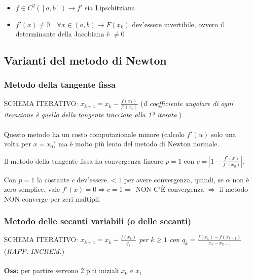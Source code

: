 \documentclass[a4paper, 11pt]{article}
\begin{document}
        \begin{itemize}
            \item $f \in C^2([a, b]) \longrightarrow f'$ sia Lipschitziana
            \item $f'(x) \neq 0 \quad \forall x \in (a, b) \longrightarrow F(x_k)$ dev'essere invertibile, ovvero il determinante della Jacobiana è $\neq 0$
        \end{itemize}


        \subsection{Varianti del metodo di Newton}

        \subsubsection{Metodo della tangente fissa}

        SCHEMA ITERATIVO: $x_{k+1} = x_k - \frac{f(x_k)}{f'(x_0)}$ \quad (\textit{il coefficiente angolare di ogni iterazione è quello della tangente tracciata alla 1ª iterata.})

        \paragraph{}
        Questo metodo ha un costo computazionale minore (calcolo $f'(\alpha)$ solo una volta per $x=x_0$) ma è molto più lento del metodo di Newton normale.

        Il metodo della tangente fissa ha convergenza lineare $p=1$ con $c = \left| 1 - \frac{f'(x)}{f'(x_0)} \right|$.

        Con $p=1$ la costante $c$ dev'essere $<1$ per avere convergenza, quindi, se $\alpha$ non è zero semplice, vale $f'(x) = 0 \Rightarrow c = 1 \Rightarrow$ NON C'È convergenza $\Rightarrow$ il metodo NON converge per zeri multipli.


        \subsubsection{Metodo delle secanti variabili (o delle secanti)}

        SCHEMA ITERATIVO: $x_{k+1} = x_k - \frac{f(x_k)}{q_k}$ \quad \textit{per $k \geq 1$} \quad \textit{con $q_k = \frac{f(x_k) - f(x_{k-1})}{x_k - x_{k-1}}$} \quad (\textit{RAPP. INCREM.})
        
        \paragraph{}
        \textbf{Oss: }{per partire servono 2 p.ti iniziali $x_0$ e $x_1$}
        
\end{document}
